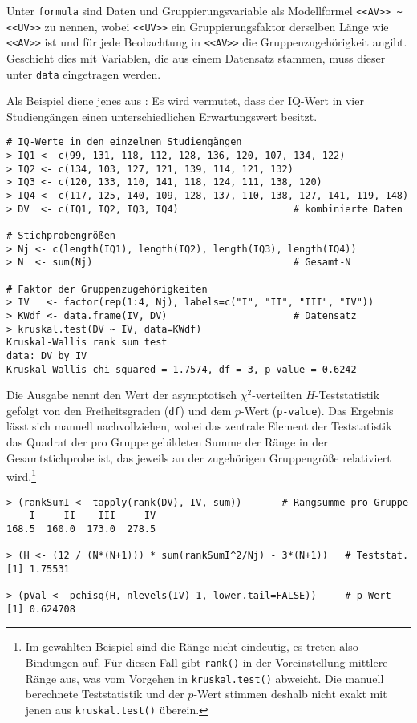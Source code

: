 Unter \lstinline!formula! sind Daten und Gruppierungsvariable als Modellformel \lstinline!<<AV>> ~ <<UV>>! zu nennen, wobei \lstinline!<<UV>>! ein Gruppierungsfaktor derselben Länge wie \lstinline!<<AV>>! ist und für jede Beobachtung in \lstinline!<<AV>>! die Gruppenzugehörigkeit angibt. Geschieht dies mit Variablen, die aus einem Datensatz stammen, muss dieser unter \lstinline!data! eingetragen werden.

Als Beispiel diene jenes aus : Es wird vermutet, dass der IQ-Wert in vier Studiengängen einen unterschiedlichen Erwartungswert besitzt.
\begin{lstlisting}
# IQ-Werte in den einzelnen Studiengängen
> IQ1 <- c(99, 131, 118, 112, 128, 136, 120, 107, 134, 122)
> IQ2 <- c(134, 103, 127, 121, 139, 114, 121, 132)
> IQ3 <- c(120, 133, 110, 141, 118, 124, 111, 138, 120)
> IQ4 <- c(117, 125, 140, 109, 128, 137, 110, 138, 127, 141, 119, 148)
> DV  <- c(IQ1, IQ2, IQ3, IQ4)                    # kombinierte Daten

# Stichprobengrößen
> Nj <- c(length(IQ1), length(IQ2), length(IQ3), length(IQ4))
> N  <- sum(Nj)                                   # Gesamt-N

# Faktor der Gruppenzugehörigkeiten
> IV   <- factor(rep(1:4, Nj), labels=c("I", "II", "III", "IV"))
> KWdf <- data.frame(IV, DV)                      # Datensatz
> kruskal.test(DV ~ IV, data=KWdf)
Kruskal-Wallis rank sum test
data: DV by IV
Kruskal-Wallis chi-squared = 1.7574, df = 3, p-value = 0.6242
\end{lstlisting}

Die Ausgabe nennt den Wert der asymptotisch $\chi^{2}$-verteilten $H$-Teststatistik gefolgt von den Freiheitsgraden (\lstinline!df!) und dem $p$-Wert (\lstinline!p-value!). Das Ergebnis lässt sich manuell nachvollziehen, wobei das zentrale Element der Teststatistik das Quadrat der pro Gruppe gebildeten Summe der Ränge in der Gesamtstichprobe ist, das jeweils an der zugehörigen Gruppengröße relativiert wird.\footnote{Im gewählten Beispiel sind die Ränge nicht eindeutig, es treten also Bindungen auf. Für diesen Fall gibt \lstinline!rank()! in der Voreinstellung mittlere Ränge aus, was vom Vorgehen in \lstinline!kruskal.test()! abweicht. Die manuell berechnete Teststatistik und der $p$-Wert stimmen deshalb nicht exakt mit jenen aus \lstinline!kruskal.test()! überein.}
\begin{lstlisting}
> (rankSumI <- tapply(rank(DV), IV, sum))       # Rangsumme pro Gruppe
    I     II    III     IV
168.5  160.0  173.0  278.5

> (H <- (12 / (N*(N+1))) * sum(rankSumI^2/Nj) - 3*(N+1))   # Teststat.
[1] 1.75531

> (pVal <- pchisq(H, nlevels(IV)-1, lower.tail=FALSE))     # p-Wert
[1] 0.624708
\end{lstlisting}


